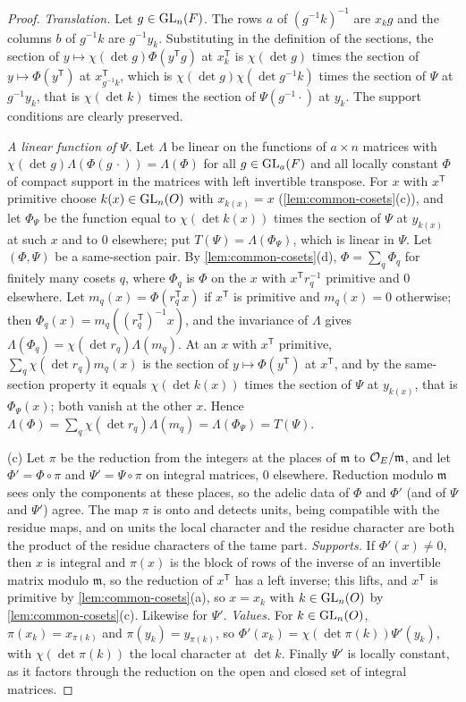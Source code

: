 \begin{proof}
\emph{Translation.} Let $g\in\operatorname{GL}_n(F)$. The rows $a$ of $(g^{-1}k)^{-1}$ are $x_kg$ and the columns $b$ of $g^{-1}k$ are $g^{-1}y_k$. Substituting in the definition of the sections, the section of
$y\mapsto\chi(\det g)\Phi(y^{\mathsf T}g)$ at $x_k^{\mathsf T}$ is $\chi(\det g)$ times the section of $y\mapsto\Phi(y^{\mathsf T})$ at $x_{g^{-1}k}^{\mathsf T}$, which is $\chi(\det g)\chi(\det g^{-1}k)$ times the section of
$\Psi$ at $g^{-1}y_k$, that is $\chi(\det k)$ times the section of $\Psi(g^{-1}\cdot)$ at $y_k$. The support conditions are clearly preserved.

\emph{A linear function of $\Psi$.} Let $\Lambda$ be linear on the functions of $a\times n$ matrices with $\chi(\det g)\Lambda(\Phi(g\,\cdot))=\Lambda(\Phi)$ for all $g\in\operatorname{GL}_a(F)$ and all locally constant $\Phi$
of compact support in the matrices with left invertible transpose. For $x$ with $x^{\mathsf T}$ primitive choose $k(x)\in\operatorname{GL}_n(O)$ with $x_{k(x)}=x$ (\cref{lem:common-cosets}(c)), and let $\Phi_\Psi$ be the
function equal to $\chi(\det k(x))$ times the section of $\Psi$ at $y_{k(x)}$ at such $x$ and to $0$ elsewhere; put $T(\Psi)=\Lambda(\Phi_\Psi)$, which is linear in $\Psi$. Let $(\Phi,\Psi)$ be a same-section pair.
By \cref{lem:common-cosets}(d), $\Phi=\sum_q\Phi_q$ for finitely many cosets $q$, where $\Phi_q$ is $\Phi$ on the $x$ with $x^{\mathsf T}r_q^{-1}$ primitive and $0$ elsewhere. Let $m_q(x)=\Phi(r_q^{\mathsf T}x)$ if
$x^{\mathsf T}$ is primitive and $m_q(x)=0$ otherwise; then $\Phi_q(x)=m_q((r_q^{\mathsf T})^{-1}x)$, and the invariance of $\Lambda$ gives $\Lambda(\Phi_q)=\chi(\det r_q)\Lambda(m_q)$. At an $x$ with $x^{\mathsf T}$
primitive, $\sum_q\chi(\det r_q)m_q(x)$ is the section of $y\mapsto\Phi(y^{\mathsf T})$ at $x^{\mathsf T}$, and by the same-section property it equals $\chi(\det k(x))$ times the section of $\Psi$ at $y_{k(x)}$, that
is $\Phi_\Psi(x)$; both vanish at the other $x$. Hence $\Lambda(\Phi)=\sum_q\chi(\det r_q)\Lambda(m_q)=\Lambda(\Phi_\Psi)=T(\Psi)$.

(c) Let $\pi$ be the reduction from the integers at the places of $\mathfrak m$ to $\mathcal{O}_E/\mathfrak m$, and let $\Phi'=\Phi\circ\pi$ and $\Psi'=\Psi\circ\pi$ on integral matrices, $0$ elsewhere. Reduction modulo
$\mathfrak m$ sees only the components at these places, so the adelic data of $\Phi$ and $\Phi'$ (and of $\Psi$ and $\Psi'$) agree. The map $\pi$ is onto and detects units, being compatible with the residue
maps, and on units the local character and the residue character are both the product of the residue characters of the tame part. \emph{Supports.} If $\Phi'(x)\ne0$, then $x$ is integral and $\pi(x)$ is
the block of rows of the inverse of an invertible matrix modulo $\mathfrak m$, so the reduction of $x^{\mathsf T}$ has a left inverse; this lifts, and $x^{\mathsf T}$ is primitive by \cref{lem:common-cosets}(a),
so $x=x_k$ with $k\in\operatorname{GL}_n(O)$ by \cref{lem:common-cosets}(c). Likewise for $\Psi'$. \emph{Values.} For $k\in\operatorname{GL}_n(O)$, $\pi(x_k)=x_{\pi(k)}$ and $\pi(y_k)=y_{\pi(k)}$, so
$\Phi'(x_k)=\chi(\det\pi(k))\Psi'(y_k)$, with $\chi(\det\pi(k))$ the local character at $\det k$. Finally $\Psi'$ is locally constant, as it factors through the reduction on the open and closed set of
integral matrices.
\end{proof}

